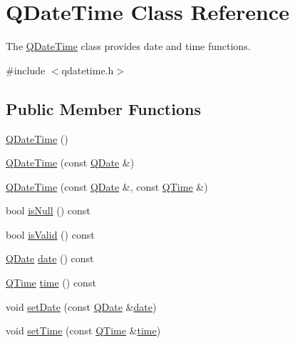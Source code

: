 \hypertarget{class_q_date_time}{}\section{Q\+Date\+Time Class Reference}
\label{class_q_date_time}


The \mbox{\hyperlink{class_q_date_time}{Q\+Date\+Time}} class provides date and time functions.  




{\ttfamily \#include $<$qdatetime.\+h$>$}

\subsection*{Public Member Functions}
\begin{DoxyCompactItemize}
\item 
\mbox{\hyperlink{class_q_date_time_a497eebb04afafe0ec04d02417b57aba8}{Q\+Date\+Time}} ()
\item 
\mbox{\hyperlink{class_q_date_time_a1da374c4242c84a1d228e572ab964dcf}{Q\+Date\+Time}} (const \mbox{\hyperlink{class_q_date}{Q\+Date}} \&)
\item 
\mbox{\hyperlink{class_q_date_time_ac4b95956f346d9213b43624ec93e5625}{Q\+Date\+Time}} (const \mbox{\hyperlink{class_q_date}{Q\+Date}} \&, const \mbox{\hyperlink{class_q_time}{Q\+Time}} \&)
\item 
bool \mbox{\hyperlink{class_q_date_time_a4444ba427d3c8c7c1af2eef6e462d963}{is\+Null}} () const
\item 
bool \mbox{\hyperlink{class_q_date_time_aa10098d497d4561e20488cb324d314c6}{is\+Valid}} () const
\item 
\mbox{\hyperlink{class_q_date}{Q\+Date}} \mbox{\hyperlink{class_q_date_time_ae7d86dc9b95e2aeab38391033eeff9eb}{date}} () const
\item 
\mbox{\hyperlink{class_q_time}{Q\+Time}} \mbox{\hyperlink{class_q_date_time_a7b8eefbd04093747deb22f5cd6b673c1}{time}} () const
\item 
void \mbox{\hyperlink{class_q_date_time_aba938ae7007f881a6a641bbdb3ac634a}{set\+Date}} (const \mbox{\hyperlink{class_q_date}{Q\+Date}} \&\mbox{\hyperlink{class_q_date_time_ae7d86dc9b95e2aeab38391033eeff9eb}{date}})
\item 
void \mbox{\hyperlink{class_q_date_time_a6384cf8a49551d5e42786ab850894813}{set\+Time}} (const \mbox{\hyperlink{class_q_time}{Q\+Time}} \&\mbox{\hyperlink{class_q_date_time_a7b8eefbd04093747deb22f5cd6b673c1}{time}})
\item 

\end{DoxyCompactItemize}
